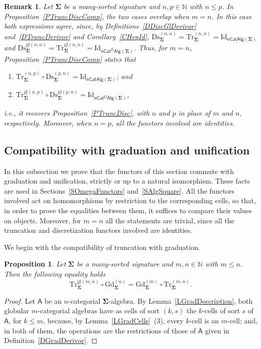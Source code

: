 \documentclass[a4paper, reqno
]{amsart}
\newcommand{\sig}[1]{\mathbf{#1}}             %
\newcommand{\calg}[1]{\boldsymbol{\mathsf{#1}}} %
\newcommand{\Id}{\mathrm{Id}}
\newcommand{\gl}{\mathrm{gl}}                %
\newcommand{\Gd}{\mathrm{Gd}}
\newcommand{\Ds}{\mathrm{Ds}}
\newcommand{\Tr}{\mathrm{Tr}}
\theoremstyle{plain}
\newtheorem{proposition}[theorem]{Proposition}
\newtheorem{remark}[theorem]{Remark}
\theoremstyle{definition}
\begin{document}
\begin{remark}\label{RTruncDiscCompEqual}
Let $\sig{\Sigma}$ be a many-sorted signature and $n,p\in\mathbb{N}$ with $n\leq p$.
In Proposition~\ref{PTruncDiscComp}, the two cases overlap when $m=n$.
In this case both expressions agree, since, by Definitions~\ref{DDiscGlDerivor} and~\ref{DTruncDerivor} and Corollary~\ref{CHepId}, $\Ds^{(n,n)}_{\sig{\Sigma}}=\Tr^{(n,n)}_{\sig{\Sigma}}=\Id_{\mathsf{nCatAlg}(\sig{\Sigma})}$ and $\Ds^{\gl(n,n)}_{\sig{\Sigma}}=\Tr^{\gl(n,n)}_{\sig{\Sigma}}=\Id_{\mathsf{nCat}^{\gl}\mathsf{Alg}(\sig{\Sigma})}$.
Thus, for $m=n$, Proposition~\ref{PTruncDiscComp} states that
\begin{enumerate}
	\item
	$\Tr^{(n,p)}_{\sig{\Sigma}}\circ\Ds^{(p,n)}_{\sig{\Sigma}}=\Id_{\mathsf{nCatAlg}(\sig{\Sigma})}$; and

	\item
	$\Tr^{\gl(n,p)}_{\sig{\Sigma}}\circ\Ds^{\gl(p,n)}_{\sig{\Sigma}}=\Id_{\mathsf{nCat}^{\gl}\mathsf{Alg}(\sig{\Sigma})}$,
\end{enumerate}
i.e., it recovers Proposition~\ref{PTruncDisc}, with $n$ and $p$ in place of $m$ and $n$, respectively.
Moreover, when $n=p$, all the functors involved are identities.
\end{remark}

\subsection{Compatibility with graduation and unification}\label{SCompatGdUf}

In this subsection we prove that the functors of this section commute with graduation and unification, strictly or up to a natural isomorphism.
These facts are used in Sections~\ref{SOmegaFunctors} and~\ref{SAlgSquare}.
All the functors involved act on homomorphisms by restriction to the corresponding cells, so that, in order to prove the equalities between them, it suffices to compare their values on objects.
Moreover, for $m=n$ all the statements are trivial, since all the truncation and discretization functors involved are identities.

We begin with the compatibility of truncation with graduation.

\begin{proposition}\label{PCompatGdTr}
Let $\sig{\Sigma}$ be a many-sorted signature and $m,n\in\mathbb{N}$ with $m\leq n$.
Then the following equality holds
$$
\Tr^{\gl(m,n)}_{\sig{\Sigma}}\circ\Gd^{(n)}_{\sig{\Sigma}}=\Gd^{(m)}_{\sig{\Sigma}}\circ \Tr^{(m,n)}_{\sig{\Sigma}}.
$$
\end{proposition}
\begin{proof}
Let $\calg{A}$ be an $n$-categorial $\sig{\Sigma}$-algebra.
By Lemma~\ref{LGradDescription}, both globular $m$-categorial algebras have as cells of sort $(k,s)$ the $k$-cells of sort $s$ of $\calg{A}$, for $k\leq m$, because, by Lemma~\ref{LGradCells}~(3), every $k$-cell is an $m$-cell; and, in both of them, the operations are the restrictions of those of $\calg{A}$ given in Definition~\ref{DGradDerivor}.
\end{proof}
\end{document}
